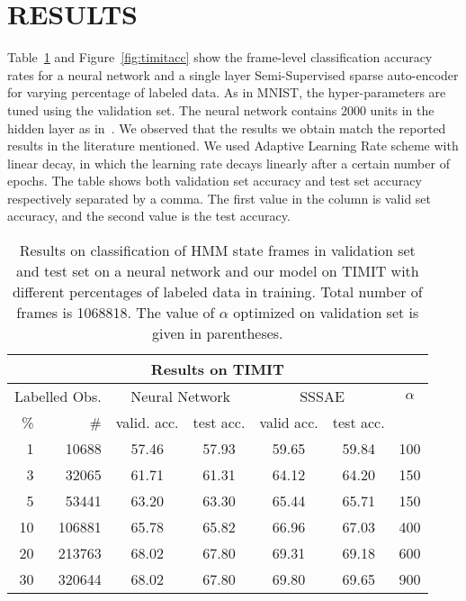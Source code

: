 \section{RESULTS}
Table~\ref{table:timit} and Figure~\ref{fig:timitacc} show the frame-level classification accuracy rates for a neural network and a single layer Semi-Supervised sparse auto-encoder for varying percentage of labeled data. As in MNIST, the hyper-parameters are tuned using the validation set. The neural network contains 2000 units in the hidden layer as in~\cite{liu-2013,labiak-2011}. We observed that the results we obtain match the reported results in the literature mentioned. We used Adaptive Learning Rate scheme with linear decay, in which the learning rate decays linearly after a certain number of epochs. 
The table shows both validation set accuracy and test set accuracy respectively separated by a comma. The first value in the column is valid set accuracy, and the second value is the test accuracy. 


\begin{table}[h!]
\centering
  \begin{tabular} {|rrccccc|}
    \hline\hline
    \multicolumn{7}{|c|}{Results on TIMIT} \\
    \hline
   \multicolumn{2}{|c}{Labelled Obs.} & \multicolumn{2}{c}{Neural Network} & \multicolumn{2}{c}{SSSAE} & $\alpha$  \\ [0.4ex]
   \% & \# & valid. acc. & test acc. & valid acc. & test acc. & \\
    \hline
  1 & 10688 & 57.46 & 57.93 & 59.65 & 59.84 & 100 \\
  3 & 32065 & 61.71 & 61.31 & 64.12 & 64.20 & 150 \\
  5 & 53441 & 63.20 & 63.30 & 65.44 & 65.71 & 150 \\  
  10 & 106881 & 65.78 & 65.82 & 66.96 & 67.03 & 400 \\
  20 & 213763 & 68.02 & 67.80 & 69.31 & 69.18 & 600 \\
    30 & 320644 & 68.02 & 67.80 & 69.80 & 69.65 & 900 \\
    \hline\hline
  \end{tabular}
    \caption{Results on classification of HMM state frames in validation set and test set on a neural network and our model on TIMIT with different percentages of labeled data in training. Total number of frames is 1068818. The value of $\alpha$ optimized on validation set is given in parentheses.}
    \label{table:timit}
\end{table}

